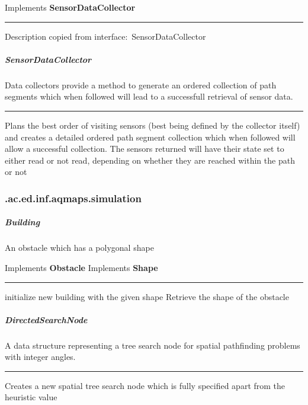 Implements \textbf{ SensorDataCollector }
\hrule
\begin{mitem}
\scriptsize
	{}
	{Description copied from interface:~SensorDataCollector}
\end{mitem}

\subparagraph{ SensorDataCollector } Data collectors provide a method to generate an ordered collection of path segments which when followed
 will lead to a successfull retrieval of sensor data.
 
\hrule
\begin{mitem}
\scriptsize
	{Plans the best order of visiting sensors (best being defined by the collector itself)\newline%
 and creates a detailed ordered path segment collection which when followed will allow a successful collection. \newline%
 The sensors returned will have their state set to either\newline%
 read or not read, depending on whether they are reached within the path or not}
\end{mitem}

\subsubsection{ .ac.ed.inf.aqmaps.simulation }
\subparagraph{ Building } An obstacle which has a polygonal shape
 
Implements \textbf{ Obstacle }
Implements \textbf{ Shape }
\hrule
\begin{mitem}
\scriptsize
	{initialize new building with the given shape}
	{Retrieve the shape of the obstacle}
\end{mitem}

\subparagraph{ DirectedSearchNode } A data structure representing a tree search node for 
 spatial pathfinding problems with integer angles.
 
\hrule
\begin{mitem}
\scriptsize
	{Creates a new spatial tree search node which is fully specified apart from\newline%
 the heuristic value}
	{}
\end{mitem}

